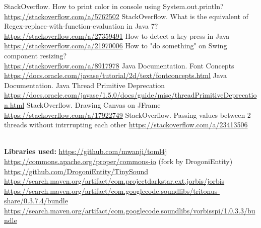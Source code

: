 \documentclass{article}
\begin{document}
\begin{thebibliography}{9}
         StackOverflow. How to print color in console using System.out.println? \\
        \url{https://stackoverflow.com/a/5762502}
         StackOverflow. What is the equivalent of Regex-replace-with-function-evaluation in Java 7? \url{https://stackoverflow.com/a/27359491}
         How to detect a key press in Java \\
        \url{https://stackoverflow.com/a/21970006}
         How to "do something" on Swing component resizing? \\
        \url{https://stackoverflow.com/a/8917978}
         Java Documentation. Font Concepts \\
        \url{https://docs.oracle.com/javase/tutorial/2d/text/fontconcepts.html}
         Java Documentation. Java Thread Primitive Deprecation \url{https://docs.oracle.com/javase/1.5.0/docs/guide/misc/threadPrimitiveDeprecation.html}
         StackOverflow. Drawing Canvas on JFrame \\
        \url{https://stackoverflow.com/a/17922749}
         StackOverflow. Passing values between 2 threads without intrrrupting each other \url{https://stackoverflow.com/a/23413506}

        \textbf{\\ Libraries used:}
         \url{https://github.com/mwanji/toml4j}
         \url{https://commons.apache.org/proper/commons-io}
         (fork by DrogoniEntity) \url{https://github.com/DrogoniEntity/TinySound}
         \\
        \url{https://search.maven.org/artifact/com.projectdarkstar.ext.jorbis/jorbis}
         \\
        \url{https://search.maven.org/artifact/com.googlecode.soundlibs/tritonus-share/0.3.7.4/bundle}
         \\
        \url{https://search.maven.org/artifact/com.googlecode.soundlibs/vorbisspi/1.0.3.3/bundle}


\end{thebibliography}
\end{document}
